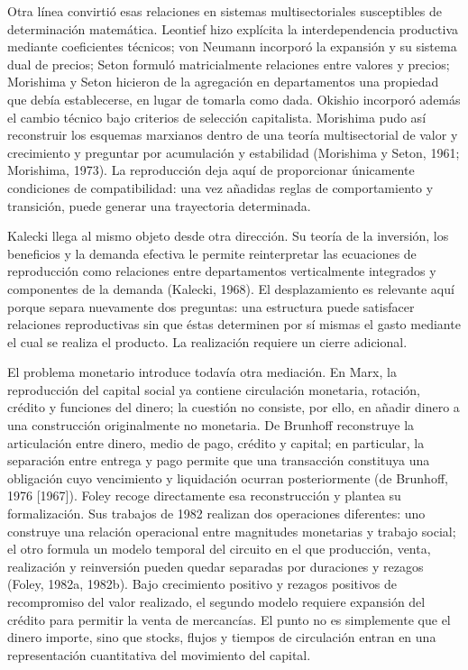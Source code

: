 \documentclass[10pt,a5paper,twoside]{article}
\begin{document}
Otra línea convirtió esas relaciones en sistemas multisectoriales susceptibles
de determinación matemática. Leontief hizo explícita la interdependencia
productiva mediante coeficientes técnicos; von Neumann incorporó la expansión y
su sistema dual de precios; Seton formuló matricialmente relaciones entre
valores y precios; Morishima y Seton hicieron de la agregación en departamentos
una propiedad que debía establecerse, en lugar de tomarla como dada. Okishio
incorporó además el cambio técnico bajo criterios de selección capitalista.
Morishima pudo así reconstruir los esquemas marxianos dentro de una teoría
multisectorial de valor y crecimiento y preguntar por acumulación y estabilidad
(Morishima y Seton, 1961; Morishima, 1973). La reproducción deja aquí de
proporcionar únicamente condiciones de compatibilidad: una vez añadidas reglas
de comportamiento y transición, puede generar una trayectoria determinada.

Kalecki llega al mismo objeto desde otra dirección. Su teoría de la inversión,
los beneficios y la demanda efectiva le permite reinterpretar las ecuaciones de
reproducción como relaciones entre departamentos verticalmente integrados y
componentes de la demanda (Kalecki, 1968). El desplazamiento es relevante aquí
porque separa nuevamente dos preguntas: una estructura puede satisfacer
relaciones reproductivas sin que éstas determinen por sí mismas el gasto
mediante el cual se realiza el producto. La realización requiere un cierre
adicional.

El problema monetario introduce todavía otra mediación. En Marx, la
reproducción del capital social ya contiene circulación monetaria, rotación,
crédito y funciones del dinero; la cuestión no consiste, por ello, en añadir
dinero a una construcción originalmente no monetaria. De Brunhoff reconstruye
la articulación entre dinero, medio de pago, crédito y capital; en particular,
la separación entre entrega y pago permite que una transacción constituya una
obligación cuyo vencimiento y liquidación ocurran posteriormente (de Brunhoff,
1976 {[}1967{]}). Foley recoge directamente esa reconstrucción y plantea su
formalización. Sus trabajos de 1982 realizan dos operaciones diferentes: uno
construye una relación operacional entre magnitudes monetarias y trabajo social;
el otro formula un modelo temporal del circuito en el que producción, venta,
realización y reinversión pueden quedar separadas por duraciones y rezagos
(Foley, 1982a, 1982b). Bajo crecimiento positivo y rezagos positivos de
recompromiso del valor realizado, el segundo modelo requiere expansión del
crédito para permitir la venta de mercancías. El punto no es simplemente que el
dinero importe, sino que stocks, flujos y tiempos de circulación entran en una
representación cuantitativa del movimiento del capital.
\end{document}
